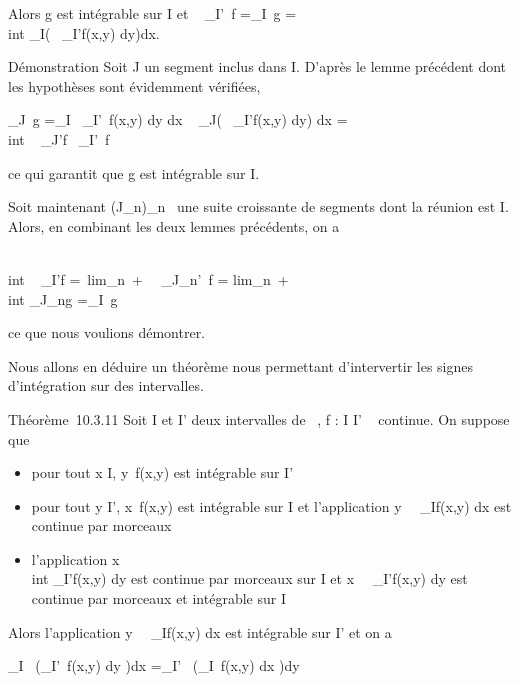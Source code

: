 \documentclass[]{article}
\begin{document}
Alors g est intégrable sur I et \int ~
\int  \_I\timesI'~f
=\int  \_I~g =\\int
 \_I\left (\int ~
\_I'f(x,y) dy\right )dx.

Démonstration Soit J un segment inclus dans I. D'après le lemme
précédent dont les hypothèses sont évidemment vérifiées,

\int  \_J~\textbar{}g\textbar{}
=\int  \_I~\left
\textbar{}\int  \_I'~f(x,y)
dy\right \textbar{} dx \leq\int ~
\_J\left (\int ~
\_I'\textbar{}f(x,y)\textbar{} dy\right ) dx
=\int  \\int ~
\_J\timesI'\textbar{}f\textbar{}\leq\int ~
\int  \_I\timesI'~\textbar{}f\textbar{}

ce qui garantit que g est intégrable sur I.

Soit maintenant (J\_n)\_n\in{}~ une suite croissante de
segments dont la réunion est I. Alors, en combinant les deux lemmes
précédents, on a

\int  \\int ~
\_I\timesI'f =\
lim\_n\rightarrow~+\infty~\int ~
\int  \_J\_n\timesI'~f
= lim\_n\rightarrow~+\infty~~\\int
 \_J\_ng =\int  \_I~g

ce que nous voulions démontrer.

Nous allons en déduire un théorème nous permettant d'intervertir les
signes d'intégration sur des intervalles.

Théorème~10.3.11 Soit I et I' deux intervalles de ~, f : I \times I' \rightarrow~ 
continue. On suppose que

\begin{itemize}
\itemsep1pt\parskip0pt
\item
  pour tout x \in I, y\mapsto~f(x,y) est intégrable
  sur I'
\item
  pour tout y \in I', x\mapsto~f(x,y) est intégrable
  sur I et l'application
  y\mapsto~\int ~
  \_If(x,y) dx est continue par morceaux
\item
  l'application x\mapsto~\\int
   \_I'f(x,y) dy est continue par morceaux sur I et
  x\mapsto~\int ~
  \_I'\textbar{}f(x,y)\textbar{} dy est continue par morceaux et
  intégrable sur I
\end{itemize}

Alors l'application
y\mapsto~\int ~
\_If(x,y) dx est intégrable sur I' et on a

\int  \_I~\left
(\int  \_I'~f(x,y) dy\right
)dx =\int  \_I'~\left
(\int  \_I~f(x,y) dx\right
)dy
\end{document}

